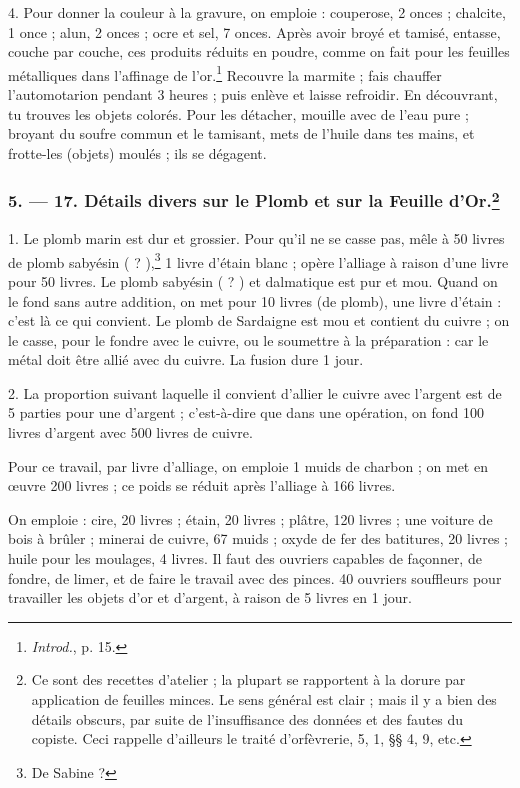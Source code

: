 \documentclass[a4paper, 11pt, oneside, polutonikogreek, french]{article}
\begin{document}
4. Pour donner la couleur à la gravure, on emploie : couperose, 2 onces ; chalcite, 1 once ; alun, 2 onces ; ocre et sel, 7 onces. Après avoir broyé et tamisé, entasse, couche par couche, ces produits réduits en poudre, comme on fait pour les feuilles métalliques dans l'affinage de l'or.\footnote{\emph{Introd.}, p. 15.} Recouvre la marmite ; fais chauffer l'automotarion pendant 3 heures ; puis enlève et laisse refroidir. En découvrant, tu trouves les objets colorés. Pour les détacher, mouille avec de l'eau pure ; broyant du soufre commun et le tamisant, mets de l'huile dans tes mains, et frotte-les (objets) moulés ; ils se dégagent.

\bigskip
\centerline{\EightStarTaper}
\centerline{\EightStarTaper\EightStarTaper}
\bigskip

\subsubsection[5. --- 17. Détails divers sur le Plomb et sur la Feuille d'Or.]{5. --- 17. Détails divers sur le Plomb et sur la Feuille d'Or.\footnote{Ce sont des recettes d'atelier ; la plupart se rapportent à la dorure par application de feuilles minces. Le sens général est clair ; mais il y a bien des détails obscurs, par suite de l'insuffisance des données et des fautes du copiste. Ceci rappelle d'ailleurs le traité d'orfèvrerie, 5, 1, §§ 4, 9, etc.}}

1. Le plomb marin est dur et grossier. Pour qu'il ne se casse pas, mêle à 50 livres de plomb sabyésin ( ? ),\footnote{De Sabine ?} 1 livre d'étain blanc ; opère l'alliage à raison d'une livre pour 50 livres. Le plomb sabyésin ( ? ) et dalmatique est pur et mou. Quand on le fond sans autre addition, on met pour 10 livres (de plomb), une livre d'étain : c'est là ce qui convient. Le plomb de Sardaigne est mou et contient du cuivre ; on le casse, pour le fondre avec le cuivre, ou le soumettre à la préparation : car le métal doit être allié avec du cuivre. La fusion dure 1 jour.

2. La proportion suivant laquelle il convient d'allier le cuivre avec l'argent est de 5 parties pour une d'argent ; c'est-à-dire que dans une opération, on fond 100 livres d'argent avec 500 livres de cuivre.

Pour ce travail, par livre d'alliage, on emploie 1 muids de charbon ; on met en œuvre 200 livres ; ce poids se réduit après l'alliage à 166 livres.

On emploie : cire, 20 livres ; étain, 20 livres ; plâtre, 120 livres ; une voiture de bois à brûler ; minerai de cuivre, 67 muids ; oxyde de fer des batitures, 20 livres ; huile pour les moulages, 4 livres. Il faut des ouvriers capables de façonner, de fondre, de limer, et de faire le travail avec des pinces. 40 ouvriers souffleurs pour travailler les objets d'or et d'argent, à raison de 5 livres en 1 jour.
\end{document}
